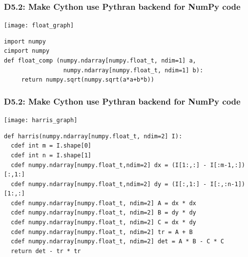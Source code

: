 \documentclass{beamer}
\begin{document}
\begin{frame}[fragile]
  \frametitle{D5.2: Make Cython use Pythran backend for NumPy code}

  \begin{center}
    \texttt{[image: float\_graph]}\\
  \end{center}
  \begin{lstlisting}
import numpy
cimport numpy
def float_comp (numpy.ndarray[numpy.float_t, ndim=1] a,
                 numpy.ndarray[numpy.float_t, ndim=1] b):
     return numpy.sqrt(numpy.sqrt(a*a+b*b))
\end{lstlisting}

\end{frame}
\begin{frame}[fragile]
  \frametitle{D5.2: Make Cython use Pythran backend for NumPy code}

  \begin{center}
    \texttt{[image: harris\_graph]}
  \end{center}
  
  \begin{lstlisting}[basicstyle=\tiny]
def harris(numpy.ndarray[numpy.float_t, ndim=2] I):
  cdef int m = I.shape[0]
  cdef int n = I.shape[1]
  cdef numpy.ndarray[numpy.float_t,ndim=2] dx = (I[1:,:] - I[:m-1,:])[:,1:]
  cdef numpy.ndarray[numpy.float_t,ndim=2] dy = (I[:,1:] - I[:,:n-1])[1:,:]
  cdef numpy.ndarray[numpy.float_t, ndim=2] A = dx * dx
  cdef numpy.ndarray[numpy.float_t, ndim=2] B = dy * dy
  cdef numpy.ndarray[numpy.float_t, ndim=2] C = dx * dy
  cdef numpy.ndarray[numpy.float_t, ndim=2] tr = A + B
  cdef numpy.ndarray[numpy.float_t, ndim=2] det = A * B - C * C
  return det - tr * tr
\end{lstlisting}

\end{frame}


\end{document}
